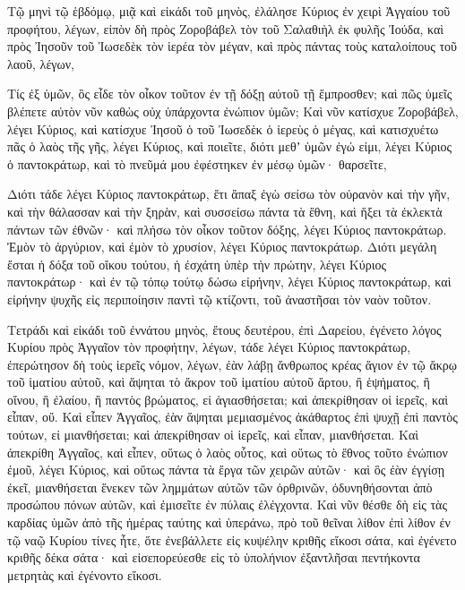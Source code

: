 {Τῷ μηνὶ τῷ ἑβδόμῳ, μιᾷ καὶ εἰκάδι τοῦ μηνὸς, ἐλάλησε Κύριος ἐν χειρὶ Ἀγγαίου τοῦ προφήτου, λέγων,
εἰπὸν δὴ πρὸς Ζοροβάβελ τὸν τοῦ Σαλαθιὴλ ἐκ φυλῆς Ἰούδα, καὶ πρὸς Ἰησοῦν τοῦ Ἰωσεδὲκ τὸν ἱερέα τὸν μέγαν, καὶ πρὸς πάντας τοὺς καταλοίπους τοῦ λαοῦ, λέγων,
\par }{\PP {}Τίς ἐξ ὑμῶν, ὃς εἶδε τὸν οἶκον τοῦτον ἐν τῇ δόξῃ αὐτοῦ τῇ ἔμπροσθεν; καὶ πῶς ὑμεῖς βλέπετε αὐτὸν νῦν καθὼς οὐχ ὑπάρχοντα ἐνώπιον ὑμῶν;
Καὶ νῦν κατίσχυε Ζοροβάβελ, λέγει Κύριος, καὶ κατίσχυε Ἰησοῦ ὁ τοῦ Ἰωσεδὲκ ὁ ἱερεὺς ὁ μέγας, καὶ κατισχυέτω πᾶς ὁ λαὸς τῆς γῆς, λέγει Κύριος, καὶ ποιεῖτε, διότι μεθʼ ὑμῶν ἐγώ εἰμι, λέγει Κύριος ὁ παντοκράτωρ,
καὶ τὸ πνεῦμά μου ἐφέστηκεν ἐν μέσῳ ὑμῶν· θαρσεῖτε,
\par }{\PP {}Διότι τάδε λέγει Κύριος παντοκράτωρ, ἔτι ἅπαξ ἐγὼ σείσω τὸν οὐρανὸν καὶ τὴν γῆν, καὶ τὴν θάλασσαν καὶ τὴν ξηρὰν,
καὶ συσσείσω πάντα τὰ ἔθνη, καὶ ἥξει τὰ ἐκλεκτὰ πάντων τῶν ἐθνῶν· καὶ πλήσω τὸν οἶκον τοῦτον δόξης, λέγει Κύριος παντοκράτωρ.
Ἐμὸν τὸ ἀργύριον, καὶ ἐμὸν τὸ χρυσίον, λέγει Κύριος παντοκράτωρ.
Διότι μεγάλη ἔσται ἡ δόξα τοῦ οἴκου τούτου, ἡ ἐσχάτη ὑπὲρ τὴν πρώτην, λέγει Κύριος παντοκράτωρ· καὶ ἐν τῷ τόπῳ τούτῳ δώσω εἰρήνην, λέγει Κύριος παντοκράτωρ, καὶ εἰρήνην ψυχῆς εἰς περιποίησιν παντὶ τῷ κτίζοντι, τοῦ ἀναστῆσαι τὸν ναὸν τοῦτον.
\par }{\PP {}Τετράδι καὶ εἰκάδι τοῦ ἐννάτου μηνὸς, ἔτους δευτέρου, ἐπὶ Δαρείου, ἐγένετο λόγος Κυρίου πρὸς Ἀγγαῖον τὸν προφήτην, λέγων,
τάδε λέγει Κύριος παντοκράτωρ, ἐπερώτησον δὴ τοὺς ἱερεῖς νόμον, λέγων,
ἐὰν λάβῃ ἄνθρωπος κρέας ἅγιον ἐν τῷ ἄκρῳ τοῦ ἱματίου αὐτοῦ, καὶ ἅψηται τὸ ἄκρον τοῦ ἱματίου αὐτοῦ ἄρτου, ἢ ἑψήματος, ἢ οἴνου, ἢ ἐλαίου, ἢ παντὸς βρώματος, εἰ ἁγιασθήσεται; καὶ ἀπεκρίθησαν οἱ ἱερεῖς, καὶ εἶπαν, οὔ.
Καὶ εἶπεν Ἀγγαῖος, ἐὰν ἅψηται μεμιασμένος ἀκάθαρτος ἐπὶ ψυχῇ ἐπὶ παντὸς τούτων, εἰ μιανθήσεται; καὶ ἀπεκρίθησαν οἱ ἱερεῖς, καὶ εἶπαν, μιανθήσεται.
Καὶ ἀπεκρίθη Ἀγγαῖος, καὶ εἶπεν, οὕτως ὁ λαὸς οὗτος, καὶ οὕτως τὸ ἔθνος τοῦτο ἐνώπιον ἐμοῦ, λέγει Κύριος, καὶ οὕτως πάντα τὰ ἔργα τῶν χειρῶν αὐτῶν· καὶ ὃς ἐὰν ἐγγίσῃ ἐκεῖ, μιανθήσεται ἕνεκεν τῶν λημμάτων αὐτῶν τῶν ὀρθρινῶν, ὀδυνηθήσονται ἀπὸ προσώπου πόνων αὐτῶν, καὶ ἐμισεῖτε ἐν πύλαις ἐλέγχοντα.
Καὶ νῦν θέσθε δὴ εἰς τὰς καρδίας ὑμῶν ἀπὸ τῆς ἡμέρας ταύτης καὶ ὑπεράνω, πρὸ τοῦ θεῖναι λίθον ἐπὶ λίθον ἐν τῷ ναῷ Κυρίου
τίνες ἦτε, ὅτε ἐνεβάλλετε εἰς κυψέλην κριθῆς εἴκοσι σάτα, καὶ ἐγένετο κριθῆς δέκα σάτα· καὶ εἰσεπορεύεσθε εἰς τὸ ὑπολήνιον ἐξαντλῆσαι πεντήκοντα μετρητὰς καὶ ἐγένοντο εἴκοσι.
}
